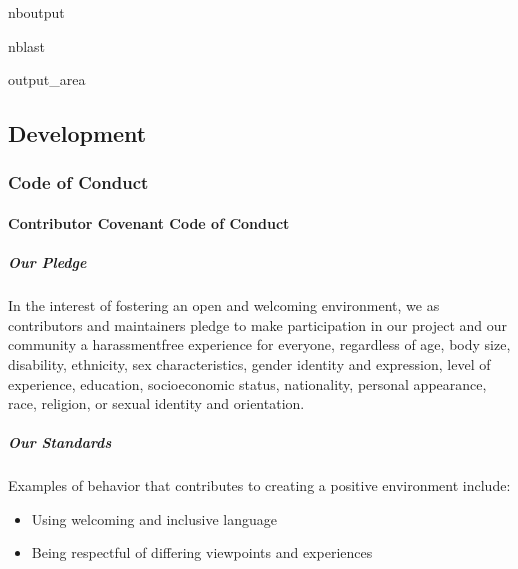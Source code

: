 \documentclass[letterpaper,10pt,english,openany,oneside]{sphinxmanual}
\begin{document}
{{{{\begin{sphinxuseclass}{nboutput}
\begin{sphinxuseclass}{nblast}
\begin{nbsphinxfancyoutput}
\begin{sphinxuseclass}{output_area}
\begin{sphinxuseclass}{}
\end{sphinxuseclass}
\end{sphinxuseclass}
\end{nbsphinxfancyoutput}

\end{sphinxuseclass}
\end{sphinxuseclass}
\sphinxstepscope


\subsection{Development}
\label{\detokenize{development/index:development}}\label{\detokenize{development/index::doc}}

\subsubsection{Code of Conduct}
\label{\detokenize{development/index:code-of-conduct}}
\sphinxstepscope


\paragraph{Contributor Covenant Code of Conduct}
\label{\detokenize{development/CODE_OF_CONDUCT:contributor-covenant-code-of-conduct}}\label{\detokenize{development/CODE_OF_CONDUCT::doc}}

\subparagraph{Our Pledge}
\label{\detokenize{development/CODE_OF_CONDUCT:our-pledge}}
\sphinxAtStartPar
In the interest of fostering an open and welcoming environment, we as
contributors and maintainers pledge to make participation in our project and
our community a harassment\sphinxhyphen{}free experience for everyone, regardless of age, body
size, disability, ethnicity, sex characteristics, gender identity and expression,
level of experience, education, socio\sphinxhyphen{}economic status, nationality, personal
appearance, race, religion, or sexual identity and orientation.


\subparagraph{Our Standards}
\label{\detokenize{development/CODE_OF_CONDUCT:our-standards}}
\sphinxAtStartPar
Examples of behavior that contributes to creating a positive environment
include:
\begin{itemize}
\item {} 
\sphinxAtStartPar
Using welcoming and inclusive language

\item {} 
\sphinxAtStartPar
Being respectful of differing viewpoints and experiences


\end{itemize}}}}}
\end{document}

